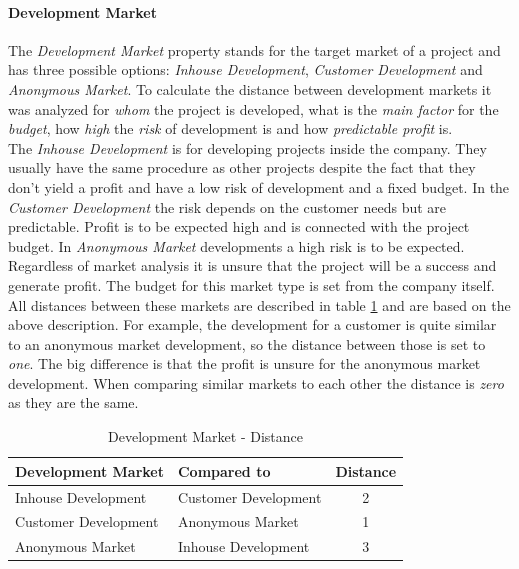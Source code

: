 \paragraph*{\textbf{Development Market}}
The \textit{Development Market} property stands for the target market of a project and has three possible options: \textit{Inhouse Development}, \textit{Customer Development} and \textit{Anonymous Market}. To calculate the distance between development markets it was analyzed for \textit{whom} the project is developed, what is the \textit{main factor} for the \textit{budget}, how \textit{high} the \textit{risk} of development is and how \textit{predictable profit} is.\\ 
The \textit{Inhouse Development} is for developing projects inside the company. They usually have the same procedure as other projects despite the fact that they don't yield a profit and have a low risk of development and a fixed budget. In the \textit{Customer Development} the risk depends on the customer needs but are predictable. Profit is to be expected high and is connected with the project budget. In \textit{Anonymous Market} developments a high risk is to be expected. Regardless of market analysis it is unsure that the project will be a success and generate profit. The budget for this market type is set from the company itself.\\
All distances between these markets are described in table \ref{property:devmarket} and are based on the above description. For example, the development for a customer is quite similar to an anonymous market development, so the distance between those is set to \textit{one}. The big difference is that the profit is unsure for the anonymous market development. When comparing similar markets to each other the distance is \textit{zero} as they are the same.
\begin{table}[h]
	\centering 
	\setlength{\tabcolsep}{4pt}
	\begin{tabular}{|l|l|c|}\hline
		Development Market		& Compared to 			&  Distance 	\\ \hline
		Inhouse Development   	& Customer Development	& 2      		\\ \hline
		Customer Development   	& Anonymous Market 		& 1      		\\ \hline
		Anonymous Market   		& Inhouse Development 	& 3     		\\ \hline
	\end{tabular} 
	\caption{Development Market - Distance} 
	\label{property:devmarket} 
\end{table}
